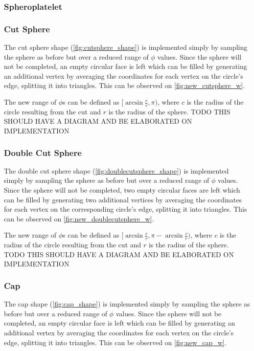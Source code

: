 \subsubsection{Spheroplatelet}

\subsubsection{Cut Sphere}
The cut sphere shape (\cref{fig:cutsphere_shape}) is implemented simply by sampling the sphere as before but over a reduced range of $\phi$ values. Since the sphere will not be completed, an empty circular face is left which can be filled by generating an additional vertex by averaging the coordinates for each vertex on the circle's edge, splitting it into triangles. This can be observed on \cref{fig:new_cutsphere_w}.

The new range of $\phi$s can be defined as $[\arcsin\frac{c}{r}, \pi)$, where $c$ is the radius of the circle resulting from the cut and $r$ is the radius of the sphere. TODO THIS SHOULD HAVE A DIAGRAM AND BE ELABORATED ON IMPLEMENTATION

\subsubsection{Double Cut Sphere}
The double cut sphere shape (\cref{fig:doublecutsphere_shape}) is implemented simply by sampling the sphere as before but over a reduced range of $\phi$ values. Since the sphere will not be completed, two empty circular faces are left which can be filled by generating two additional vertices by averaging the coordinates for each vertex on the corresponding circle's edge, splitting it into triangles. This can be observed on \cref{fig:new_doublecutsphere_w}.

The new range of $\phi$s can be defined as $[\arcsin\frac{c}{r}, \pi - \arcsin\frac{c}{r})$, where $c$ is the radius of the circle resulting from the cut and $r$ is the radius of the sphere. TODO THIS SHOULD HAVE A DIAGRAM AND BE ELABORATED ON IMPLEMENTATION

\subsubsection{Cap}
The cap shape (\cref{fig:cap_shape}) is implemented simply by sampling the sphere as before but over a reduced range of $\phi$ values. Since the sphere will not be completed, an empty circular face is left which can be filled by generating an additional vertex by averaging the coordinates for each vertex on the circle's edge, splitting it into triangles. This can be observed on \cref{fig:new_cap_w}.

